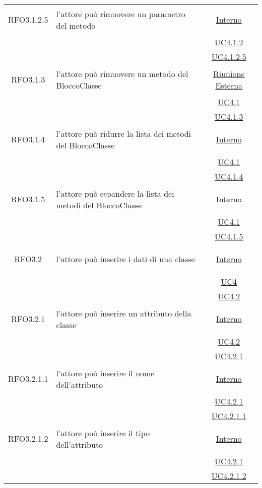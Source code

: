 \begin{longtable}{|c|>{\centering}m{7cm}|c|}
\hypertarget{RFO3.1.2.5}{RFO3.1.2.5} & l'attore può rimuovere un parametro del metodo & \hyperlink{Interno}{Interno}\\
& &\hyperref[UC4.1.2]{UC4.1.2}\\
& &\hyperref[UC4.1.2.5]{UC4.1.2.5}\\ \hline

\hypertarget{RFO3.1.3}{RFO3.1.3} & l'attore può rimuovere un metodo del BloccoClasse & \hyperlink{Riunione Esterna}{Riunione Esterna}\\
& &\hyperref[UC4.1]{UC4.1}\\
& &\hyperref[UC4.1.3]{UC4.1.3}\\ \hline

\hypertarget{RFO3.1.4}{RFO3.1.4} & l'attore può ridurre la lista dei metodi del BloccoClasse & \hyperlink{Interno}{Interno}\\
& &\hyperref[UC4.1]{UC4.1}\\
& &\hyperref[UC4.1.4]{UC4.1.4}\\ \hline

\hypertarget{RFO3.1.5}{RFO3.1.5} & l'attore può espandere la lista dei metodi del BloccoClasse & \hyperlink{Interno}{Interno}\\
& &\hyperref[UC4.1]{UC4.1}\\
& &\hyperref[UC4.1.5]{UC4.1.5}\\ \hline

\hypertarget{RFO3.2}{RFO3.2} & l'attore può inserire i dati di una classe & \hyperlink{Interno}{Interno}\\
& &\hyperref[UC4]{UC4}\\
& &\hyperref[UC4.2]{UC4.2}\\ \hline

\hypertarget{RFO3.2.1}{RFO3.2.1} & l'attore può inserire un attributo della classe & \hyperlink{Interno}{Interno}\\
& &\hyperref[UC4.2]{UC4.2}\\
& &\hyperref[UC4.2.1]{UC4.2.1}\\ \hline

\hypertarget{RFO3.2.1.1}{RFO3.2.1.1} & l'attore può inserire il nome dell'attributo & \hyperlink{Interno}{Interno}\\
& &\hyperref[UC4.2.1]{UC4.2.1}\\
& &\hyperref[UC4.2.1.1]{UC4.2.1.1}\\ \hline

\hypertarget{RFO3.2.1.2}{RFO3.2.1.2} & l'attore può inserire il tipo dell'attributo & \hyperlink{Interno}{Interno}\\
& &\hyperref[UC4.2.1]{UC4.2.1}\\
& &\hyperref[UC4.2.1.2]{UC4.2.1.2}\\ \hline


\end{longtable}
